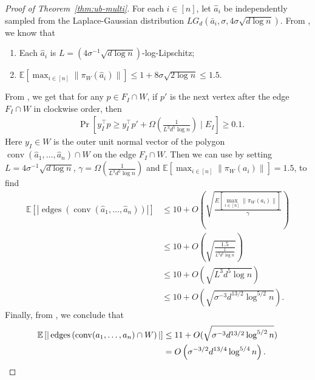 \documentclass{theoretics}
\newcommand{\E}{\mathbb E}
\newcommand{\conv}{\operatorname{conv}}
\newcommand{\edges}{\operatorname{edges}}
\begin{document}
\begin{proof}[Proof of Theorem~\ref{thm:ub-multi}]
    For each $i \in [n]$, let $\hat{a}_i$ be independently sampled from the Laplace-Gaussian distribution $LG_d(\bar{a}_i, \sigma, 4\sigma \sqrt{d\log n})$.
    From , we know that
    \begin{enumerate}
        \item Each $\hat{a}_i$ is $L = (4\sigma^{-1} \sqrt{d\log n})$-log-Lipschitz;
        \item $\E[\max_{i\in [n]}\|\pi_W(\hat{a}_i)\|] \leq 1 + 8\sigma \sqrt{2 \log n} \leq 1.5$.
    \end{enumerate}

    From , we get that for any $p \in F_I \cap W$, if $p'$ is the next vertex after the edge $F_I \cap W$ in clockwise order, then
    \begin{align*}
        & \Pr[y_I^\top p \geq y_I^\top p' + \Omega(\frac{1}{L^3d^5\log n}) \mid E_I] \geq  0.1.
    \end{align*}
    Here $y_I \in W$ is the outer unit normal vector of the polygon $\conv(\hat{a}_1, \ldots, \hat{a}_n) \cap W$ on the edge $F_I \cap W$.
    Then we can use
     by setting $L = 4\sigma^{-1} \sqrt{d\log n}$, $\gamma = \Omega(\frac{1}{L^3d^5 \log n})$
    and $\E[\max_{i \in [n]}\|\pi_W(a_i)\|]  = 1.5$, to find
    \begin{align*}
        \E\left[ |\edges\left(\conv(\hat{a}_1, \ldots, \hat{a}_n) \right) |\right]
        &\leq 10  + O(\sqrt{\frac{E[\max_{i \in [n]}\|\pi_W(a_i)\|]}{\gamma}}) \\
        &\leq 10 + O(\sqrt{\frac{1.5}{\frac{1}{L^3d^5 \log n}}}) \\
        &\leq 10 + O(\sqrt{L^3d^5 \log n}) \\
         &\leq  10 + O(\sqrt{\sigma^{-3} d^{13/2}  \log^{5/2} n}).
    \end{align*}
    Finally, from , we conclude that
    \begin{align*}
        \E\left[ |\edges\left(\conv(a_1, \ldots, a_n) \cap W \right) |\right] &\leq  11 + O(\sqrt{\sigma^{-3} d^{13/2}  \log^{5/2} n}) \\
        &= O\left(\sigma^{-3/2} d^{13/4} \log^{5/4} n  \right) .\qedhere
    \end{align*}
\end{proof}
\end{document}
